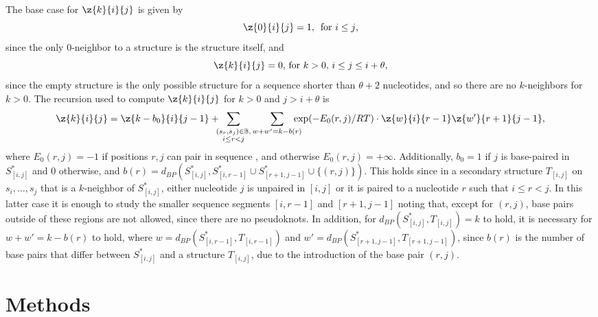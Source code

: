 The base case for $\z{k}{i}{j}$ is given by
\begin{equation}
  \z{0}{i}{j} = 1,\, \mbox{ for $i \le j$,}
  \label{eq:Zinit1}
\end{equation}
since the only $0$-neighbor to a structure \strSt
is the structure \strSt itself, and
\begin{equation}
  \z{k}{i}{j} = 0,\, \mbox{for $k > 0$, $i \le j \leq
    i+\theta$},
  \label{eq:Zinit2}
\end{equation}
since the empty structure is the only possible structure for a
sequence shorter than $\theta + 2$ nucleotides, and so there are no
$k$-neighbors for $k>0$. The recursion used to compute
$\z{k}{i}{j}$ for $k > 0$ and $j > i+\theta$ is
\begin{equation}
  \z{k}{i}{j} = \z{k -b_0}{i}{j-1} +
  \hspace{-5pt} \sum_{\substack{ (s_r,s_j) \in \mathbb{B}, \\
  i \leq r < j }} \sum_{w+w'=k - b(r)} \hspace{-10pt}
  \exp(-E_0(r,j)/RT) \cdot \z{w}{i}{r-1} \z{w'}{r+1}{j-1},
  \label{eq:N}
\end{equation}
where $E_0(r,j) = -1$ if positions $r,j$ can pair in sequence \seq,
and otherwise $E_0(r,j) = +\infty$. Additionally,
$b_0 = 1$ if $j$ is base-paired
in $S^*_{[i,j]}$ and $0$ otherwise, and
$b(r)=d_{BP}(S^*_{[i,j]}, S^*_{[i,r-1]} \cup S^*_{[r+1,j-1]} \cup\{(r,j)\})$.
This holds since in a secondary
structure $T_{[i,j]}$ on $s_i,\ldots,s_j$ that is a $k$-neighbor of
$S^*_{[i,j]}$,
either nucleotide $j$ is unpaired in $[i,j]$ or it is
paired to a nucleotide $r$ such that $i \leq r < j$. In this
latter case it is enough to study the smaller sequence segments
$[i,r-1]$ and $[r+1,j-1]$ noting that, except for $(r,j)$,
base pairs outside of these regions are not allowed, since there
are no pseudoknots. In addition,
for $d_{BP}(S^*_{[i,j]},T_{[i,j]}) = k$ to hold,
it is necessary for $w+w' = k -b(r)$ to hold, where $w =
d_{BP}(S^*_{[i,r-1]},T_{[i,r-1]})$ and $w' =
d_{BP}(S^*_{[r+1,j-1]},T_{[r+1,j-1]})$, since $b(r)$ is the
number of base pairs that differ between $S^*_{[i,j]}$ and a
structure $T_{[i,j]}$, due to the introduction of the base pair
$(r,j)$.

\section*{Methods}

